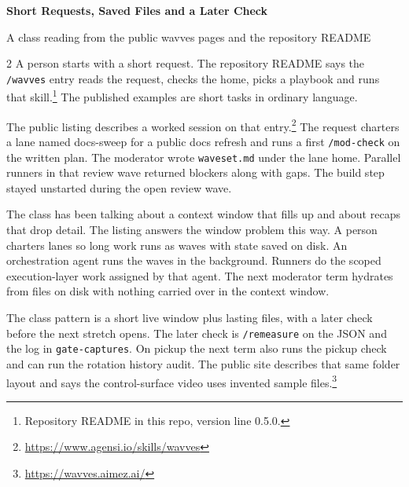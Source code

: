 \documentclass[10pt]{article}
\begin{document}
\begin{center}
{\large\bfseries Short Requests, Saved Files and a Later Check\par}
\vspace{0.25em}
{\normalsize A class reading from the public wavves pages and the repository README\par}
\end{center}

\begin{multicols}{2}
A person starts with a short request. The repository README says the \texttt{/wavves} entry reads the request, checks the home, picks a playbook and runs that skill.\footnote{Repository README in this repo, version line 0.5.0.} The published examples are short tasks in ordinary language.

The public listing describes a worked session on that entry.\footnote{\url{https://www.agensi.io/skills/wavves}} The request charters a lane named docs-sweep for a public docs refresh and runs a first \texttt{/mod-check} on the written plan. The moderator wrote \texttt{waveset.md} under the lane home. Parallel runners in that review wave returned blockers along with gaps. The build step stayed unstarted during the open review wave.

The class has been talking about a context window that fills up and about recaps that drop detail. The listing answers the window problem this way. A person charters lanes so long work runs as waves with state saved on disk. An orchestration agent runs the waves in the background. Runners do the scoped execution-layer work assigned by that agent. The next moderator term hydrates from files on disk with nothing carried over in the context window.

The class pattern is a short live window plus lasting files, with a later check before the next stretch opens. The later check is \texttt{/remeasure} on the JSON and the log in \texttt{gate-captures}. On pickup the next term also runs the pickup check and can run the rotation history audit. The public site describes that same folder layout and says the control-surface video uses invented sample files.\footnote{\url{https://wavves.aimez.ai/}}
\end{multicols}
\end{document}
